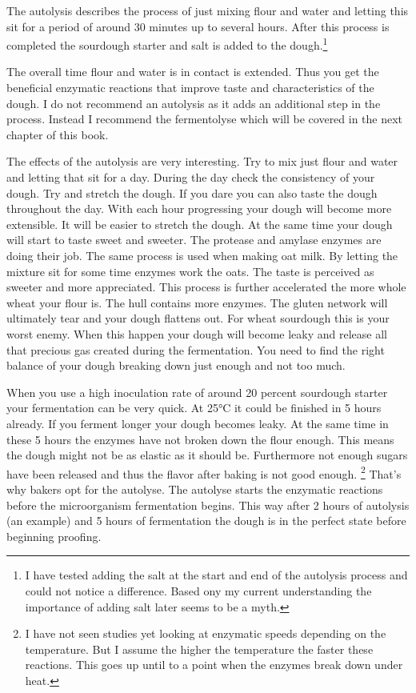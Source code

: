 The autolysis describes the process of just mixing flour and water and letting
this sit for a period of around 30 minutes up to several hours. After this
process is completed the sourdough starter and salt is added to the
dough.\footnote{I have tested adding the salt at the start and end of the
autolysis process and could not notice a difference. Based ony my current
understanding the importance of adding salt later seems to be a myth.}

The overall time flour and water is in contact is extended. Thus you get the
beneficial enzymatic reactions that improve taste and characteristics of the
dough. I do not recommend an autolysis as it adds an additional step in the
process. Instead I recommend the fermentolyse which will be covered in the
next chapter of this book.

The effects of the autolysis are very interesting. Try to mix just flour and
water and letting that sit for a day. During the day check the consistency of
your dough. Try and stretch the dough. If you dare you can also taste the
dough throughout the day. With each hour progressing your dough will become
more extensible. It will be easier to stretch the dough. At the same time your
dough will start to taste sweet and sweeter. The protease and amylase enzymes
are doing their job. The same process is used when making oat milk. By letting
the mixture sit for some time enzymes work the oats. The taste is perceived as
sweeter and more appreciated. This process is further accelerated the more
whole wheat your flour is. The hull contains more enzymes. The gluten network
will ultimately tear and your dough flattens out. For wheat sourdough this is
your worst enemy. When this happen your dough will become leaky and release
all that precious gas created during the fermentation. You need to find the
right balance of your dough breaking down just enough and not too much.

When you use a high inoculation rate of around 20 percent sourdough starter
your fermentation can be very quick. At 25°C it could be finished in 5 hours
already. If you ferment longer your dough becomes leaky. At the same time in
these 5 hours the enzymes have not broken down the flour enough. This means
the dough might not be as elastic as it should be. Furthermore not enough
sugars have been released and thus the flavor after baking is not good enough.
\footnote{I have not seen studies yet looking at enzymatic speeds depending on
the temperature. But I assume the higher the temperature the faster these
reactions. This goes up until to a point when the enzymes break down under
heat.} That's why bakers opt for the autolyse. The autolyse starts the enzymatic
reactions before the microorganism fermentation begins. This way after 2 hours
of autolysis (an example) and 5 hours of fermentation the dough is in the
perfect state before beginning proofing.

